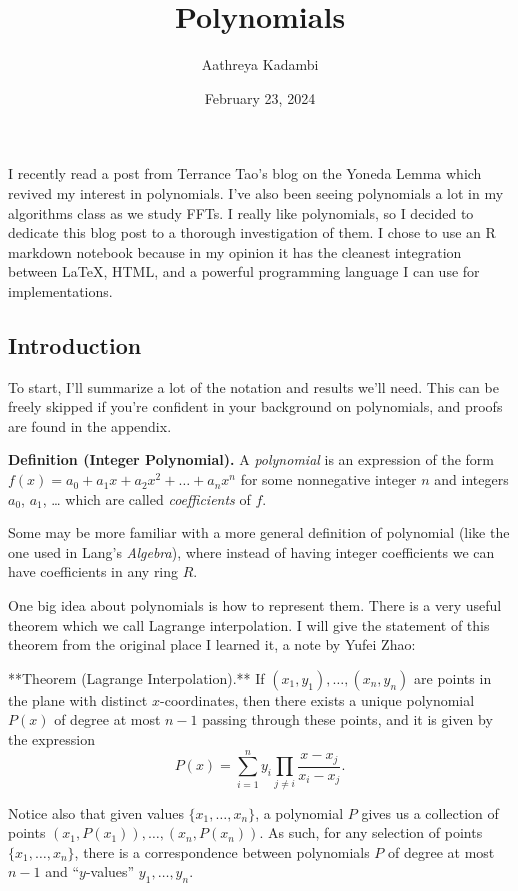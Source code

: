 \documentclass[
]{article}
\title{Polynomials}
\author{Aathreya Kadambi}
\date{February 23, 2024}
\begin{document}
\maketitle

I recently read a post from Terrance Tao's blog on the Yoneda Lemma
which revived my interest in polynomials. I've also been seeing
polynomials a lot in my algorithms class as we study FFTs. I really like
polynomials, so I decided to dedicate this blog post to a thorough
investigation of them. I chose to use an R markdown notebook because in
my opinion it has the cleanest integration between LaTeX, HTML, and a
powerful programming language I can use for implementations.

\hypertarget{introduction}{%
\subsection{Introduction}\label{introduction}}

To start, I'll summarize a lot of the notation and results we'll need.
This can be freely skipped if you're confident in your background on
polynomials, and proofs are found in the appendix.

\textbf{Definition (Integer Polynomial).} A \emph{polynomial} is an
expression of the form
\(f(x) = a_0 + a_1 x + a_2 x^2 + \dots + a_n x^n\) for some nonnegative
integer \(n\) and integers \(a_0\), \(a_1\), \ldots{} which are called
\emph{coefficients} of \(f\).

Some may be more familiar with a more general definition of polynomial
(like the one used in Lang's \emph{Algebra}), where instead of having
integer coefficients we can have coefficients in any ring \(R\).

One big idea about polynomials is how to represent them. There is a very
useful theorem which we call Lagrange interpolation. I will give the
statement of this theorem from the original place I learned it, a note
by Yufei Zhao:

\begin{theorem}
  **Theorem (Lagrange Interpolation).** If $(x_1,y_1), \dots, (x_n,y_n)$ are points in the plane with distinct $x$-coordinates, then there exists a unique polynomial $P(x)$ of degree at most $n-1$ passing through these points, and it is given by the expression
  $$P(x) = \sum_{i=1}^n y_i \prod_{j\neq i} \dfrac{x - x_j}{x_i - x_j}.$$
\end{theorem}

Notice also that given values \(\{x_1,\dots, x_n\}\), a polynomial \(P\)
gives us a collection of points \((x_1,P(x_1)), \dots, (x_n, P(x_n))\).
As such, for any selection of points \(\{x_1,\dots, x_n\}\), there is a
correspondence between polynomials \(P\) of degree at most \(n-1\) and
``\(y\)-values'' \(y_1,\dots, y_n\).
\end{document}
